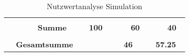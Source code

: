 \documentclass[main.tex]{subfiles} %
\begin{document}
\begin{table}[H]
\begin{tabular}{|p{0.14\linewidth}|p{0.15\linewidth}|p{0.115\linewidth}|p{0.08\linewidth}|p{0.09\linewidth}|p{0.08\linewidth}|p{0.09\linewidth}|}
        \cline{2-7}
                                                           &                                     &                                              &                                                &             &            &             \\[-9pt]
                                                           & \textbf{Summe}                      & \textbf{100}                                 &                                                & \textbf{60} &            & \textbf{40} \\[1pt]
        \hline
        \hline
        \multicolumn{2}{|c|}{}                             &                                     & \multicolumn{2}{c|}{}                        & \multicolumn{2}{c|}{}                                                                   \\[-9pt]
        \multicolumn{2}{|c|}{\textbf{Gesamtsumme}}         &                                     & \multicolumn{2}{c|}{\textbf{46}}             & \multicolumn{2}{c|}{\textbf{57.25}}                                                     \\[1pt]
        \hline
    \end{tabular}
    \caption{Nutzwertanalyse Simulation}
\end{table}
\end{document}
